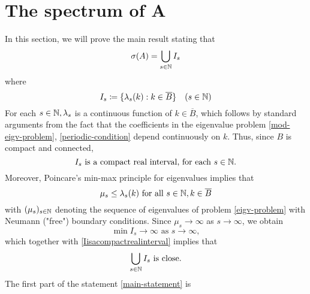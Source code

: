 \chapter{The spectrum of A}	

In this section, we will prove the main result stating that
	\begin{equation}
		\sigma(A) = \bigcup_{s \in \mathbb{N}} I_{s} \label{main-statement}
	\end{equation}
where
	\[ I_{s} \coloneqq \{ \lambda_{s}(k) : k \in \overline{B} \} \quad (s \in \mathbb{N}) \]
For each $s \in \mathbb{N}, \lambda_{s}$ is a continuous function of $k \in \overline{B}$, which follows by standard arguments from the fact that the coefficients in the eigenvalue problem \eqref{mod-eigv-problem},  \eqref{periodic-condition} depend continuously on $k$. Thus, since $B$ is compact and connected, 
	\begin{equation}
		I_{s} \text{ is a compact real interval, for each } s \in \mathbb{N}. \label{Iisacompactrealinterval}
	\end{equation} 
	Moreover, Poincare's min-max principle for eigenvalues implies that
	\[ \mu_{s} \leq \lambda_{s}(k) \text{ for all } s \in \mathbb{N}, k \in \overline{B} \]
	with $(\mu_{s})_{s \in \mathbb{N}}$ denoting the sequence of eigenvalues of problem \eqref{eigv-problem} with Neumann ("free") boundary conditions. Since $\mu_{s} \rightarrow \infty$ as $s \rightarrow \infty$, we obtain 
		\[ \min I_{s} \rightarrow \infty \text{ as } s \rightarrow \infty, \]
	which together with \eqref{Iisacompactrealinterval} implies that
		\begin{equation}
			\bigcup_{s \in \mathbb{N}} I_{s} \text{ is close.} \label{UIclosed}
		\end{equation} 
	The first part of the statement \eqref{main-statement} is 

